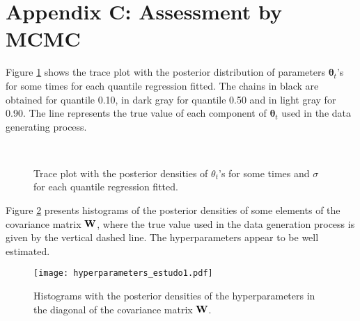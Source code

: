 \documentclass[12pt,a4paper]{article}\usepackage[]{graphicx}\usepackage[]{color}\usepackage{subfigure}
\newcommand{\bftheta}{\boldsymbol{\theta}}
\begin{document}
\section*{Appendix C: Assessment by MCMC}

Figure \ref{chain_saz} shows the trace plot with the posterior distribution of parameters $\bftheta_t$'s for some 
 times for each quantile regression fitted. The chains in black are obtained 
for quantile 0.10, in dark gray for quantile 0.50  and in light gray for  0.90. The line represents the true value of each component of 
$\bftheta_t$ used in the data generating process. 



\begin{figure}[!hbt]
\begin{center}
 \\%
\vspace{-0.3 cm}\caption{Trace plot with the posterior densities of $\theta_t$'s for some times and $\sigma$ for each quantile regression fitted.}
\label{chain_saz}
\end{center}
\end{figure}

Figure \ref{hist_hyperparam} presents histograms  of  the posterior densities of some elements of 
the covariance  matrix ${\bf W}$, where the true value used in the data generation process is given by the vertical dashed line. 
The hyperparameters appear to be well estimated.


\clearpage

\begin{figure}[h!]
\begin{center}
\texttt{[image: hyperparameters\_estudo1.pdf]} %
\end{center}
\vspace{-0.8 cm}\caption{Histograms with the posterior densities of the hyperparameters in the
diagonal of the covariance matrix ${\bf W}$.}\label{hist_hyperparam}
\end{figure}
\end{document}
